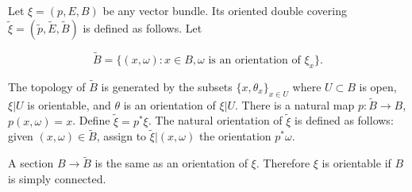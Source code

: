 Let $\xi = (p, E, B)$ be any vector bundle. Its oriented double covering $\tilde{\xi} = (\tilde{p}, \tilde{E}, \tilde{B})$ is defined as follows. Let

$$\tilde{B} = \{(x, \omega) : x \in B, \omega \text{ is an orientation of } \xi_x\}.$$

The topology of $\tilde{B}$ is generated by the subsets $\{x, \theta_x\}_{x \in U}$ where $U \subset B$ is open, $\xi|U$ is orientable, and $\theta$ is an orientation of $\xi|U$. There is a natural map $p: \tilde{B} \rightarrow B$, $p(x, \omega) = x$. Define $\tilde{\xi} = p^*\xi$. The natural orientation of $\tilde{\xi}$ is defined as follows: given $(x, \omega) \in \tilde{B}$, assign to $\tilde{\xi}|(x, \omega)$ the orientation $p^*\omega$.

A section $B \rightarrow \tilde{B}$ is the same as an orientation of $\xi$. Therefore $\xi$ is orientable if $B$ is simply connected.
